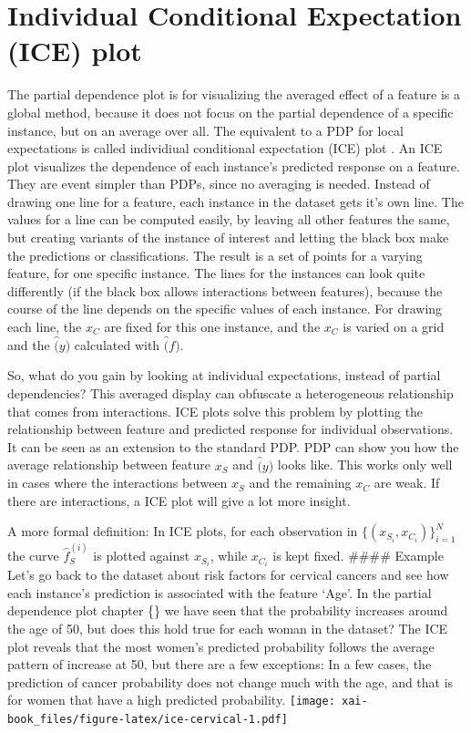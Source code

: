 \documentclass[12pt,]{krantz}
\theoremstyle{definition}
\theoremstyle{definition}
\theoremstyle{definition}
\theoremstyle{remark}
\begin{document}
\section{Individual Conditional Expectation (ICE)
plot}\label{individual-conditional-expectation-ice-plot}

The partial dependence plot is for visualizing the averaged effect of a
feature is a global method, because it does not focus on the partial
dependence of a specific instance, but on an average over all. The
equivalent to a PDP for local expectations is called individiual
conditional expectation (ICE) plot \citep{goldstein2015peeking}. An ICE
plot visualizes the dependence of each instance's predicted response on
a feature. They are event simpler than PDPs, since no averaging is
needed. Instead of drawing one line for a feature, each instance in the
dataset gets it's own line. The values for a line can be computed
easily, by leaving all other features the same, but creating variants of
the instance of interest and letting the black box make the predictions
or classifications. The result is a set of points for a varying feature,
for one specific instance. The lines for the instances can look quite
differently (if the black box allows interactions between features),
because the course of the line depends on the specific values of each
instance. For drawing each line, the \(x_C\) are fixed for this one
instance, and the \(x_C\) is varied on a grid and the \(\hat(y)\)
calculated with \(\hat(f)\).

So, what do you gain by looking at individual expectations, instead of
partial dependencies? This averaged display can obfuscate a
heterogeneous relationship that comes from interactions. ICE plots
\citep{goldstein2015peeking} solve this problem by plotting the
relationship between feature and predicted response for individual
observations. It can be seen as an extension to the standard PDP. PDP
can show you how the average relationship between feature \(x_S\) and
\(\hat(y)\) looks like. This works only well in cases where the
interactions between \(x_S\) and the remaining \(x_C\) are weak. If
there are interactions, a ICE plot will give a lot more insight.

A more formal definition: In ICE plots, for each observation in
\(\{(x_{S_i}, x_{C_i})\}_{i=1}^N\) the curve \(\hat{f}_S^{(i)}\) is
plotted against \(x_{S_i}\), while \(x_{C_i}\) is kept fixed. \#\#\#\#
Example Let's go back to the dataset about risk factors for cervical
cancers and see how each instance's prediction is associated with the
feature `Age'. In the partial dependence plot chapter \{\citet{pdp}\} we
have seen that the probability increases around the age of 50, but does
this hold true for each woman in the dataset? The ICE plot reveals that
the most women's predicted probability follows the average pattern of
increase at 50, but there are a few exceptions: In a few cases, the
prediction of cancer probability does not change much with the age, and
that is for women that have a high predicted probability.
\texttt{[image: xai-book\_files/figure-latex/ice-cervical-1.pdf]}
\end{document}
